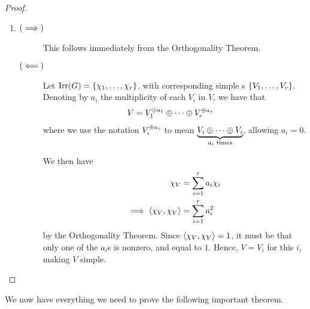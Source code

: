 \begin{proof}
\begin{enumerate}[label = \normalfont \arabic*.]
        \item 
        \begin{description}
            \item[$\left( \implies \right)$] This follows immediately from the Orthogonality Theorem.
            \item[$\left( \impliedby \right)$] Let $\operatorname{Irr}\!\left( G \right) = \left\{ \chi_1, \ldots, \chi_r \right\}$, with corresponding simple \CGM s $\left\{ V_1, \ldots, V_r \right\}$. Denoting by $a_i$ the multiplicity of each $V_i$ in $V$, we have that
            \begin{align*}
                V &= V_1^{\oplus a_1} \oplus \cdots \oplus V_r^{\oplus a_r}
            \end{align*}
            where we use the notation $V_i^{\oplus a_i}$ to mean $\underbrace{V_i \oplus \cdots \oplus V_i}_{a_i \text{ times}}$, allowing $a_i = 0$.

            We then have
            \begin{align*}
                \chi_V &= \sum_{i=1}^{r} a_i \chi_i \\
                \implies \left\langle \chi_V, \chi_V \right\rangle &= \sum_{i=1}^{r} a_i^2
            \end{align*}
            by the Orthogonality Theorem. Since $\left\langle \chi_V, \chi_V \right\rangle = 1$, it must be that only one of the $a_i$s is nonzero, and equal to $1$. Hence, $V = V_i$ for this $i$, making $V$ simple.
        \end{description}
    \end{enumerate}
\end{proof}

We now have everything we need to prove the following important theorem.

